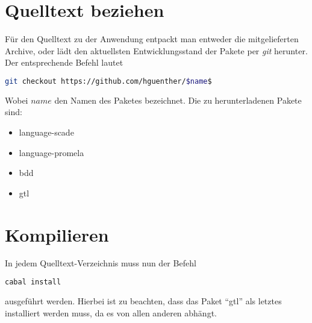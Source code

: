\section{Quelltext beziehen}
Für den Quelltext zu der Anwendung entpackt man entweder die mitgelieferten Archive, oder lädt den aktuellsten Entwicklungsstand der Pakete per \emph{git} herunter.
Der entsprechende Befehl lautet
\begin{lstlisting}[language=bash,mathescape=true]
git checkout https://github.com/hguenther/$name$
\end{lstlisting}
Wobei $name$ den Namen des Paketes bezeichnet.
Die zu herunterladenen Pakete sind:
\begin{itemize}
\item language-scade
\item language-promela
\item bdd
\item gtl
\end{itemize}
\section{Kompilieren}
In jedem Quelltext-Verzeichnis muss nun der Befehl
\begin{lstlisting}[language=bash]
cabal install
\end{lstlisting}
ausgeführt werden.
Hierbei ist zu beachten, dass das Paket "`gtl"' als letztes installiert werden muss, da es von allen anderen abhängt.

